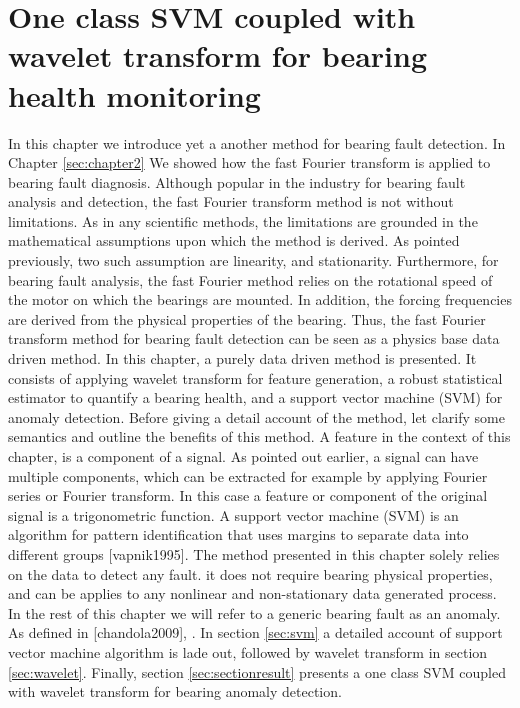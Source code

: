 \documentclass[../Main/thesis.tex]{subfiles}
\begin{document}
\chapter[One class SVM coupled with wavelet transform for bearing health monitoring]{One class SVM coupled with wavelet transform for bearing health monitoring}
\label{sec:waveletandsvm}
In this chapter we introduce yet a another method for bearing fault detection. In Chapter \ref{sec:chapter2} We showed how the fast Fourier transform is applied to bearing fault diagnosis. Although popular in the industry for bearing fault analysis and detection, the fast Fourier transform method is not without limitations. As in any scientific methods, the limitations are grounded in the mathematical assumptions upon which the method is derived. As pointed previously, two such assumption are linearity, and stationarity. Furthermore, for bearing fault analysis, the fast Fourier method relies on the rotational speed of the motor on which the bearings are mounted. In addition, the forcing frequencies are derived from the physical properties of the bearing. Thus, the fast Fourier transform method for bearing fault detection can be seen as a physics base data driven method.
\justify
In this chapter, a purely data driven method is presented. It consists of applying wavelet transform for feature generation, a robust statistical estimator to quantify a bearing health, and a support vector machine (SVM) for anomaly detection. Before giving a detail account of the method, let clarify some semantics and outline the benefits of this method. A feature in the context of this chapter, is a component of a signal. As pointed out earlier, a signal can have multiple components, which can be extracted for example by applying Fourier series or Fourier transform. In this case a feature or component of the original signal is a trigonometric function. A support vector machine (SVM) is an algorithm for pattern identification that uses margins to separate data into different groups [vapnik1995].
\justify
The method presented in this chapter solely relies on the data to detect any fault. it does not require bearing physical properties, and can be applies to any nonlinear and non-stationary data generated process. In the rest of this chapter we will refer to a generic bearing fault as an anomaly. As defined in [chandola2009], . In section \ref{sec:svm} a detailed account of support vector machine algorithm is lade out, followed by wavelet transform in section \ref{sec:wavelet}. Finally, section \ref{sec:sectionresult} presents a one class SVM coupled with wavelet transform for bearing anomaly detection.
\end{document}
